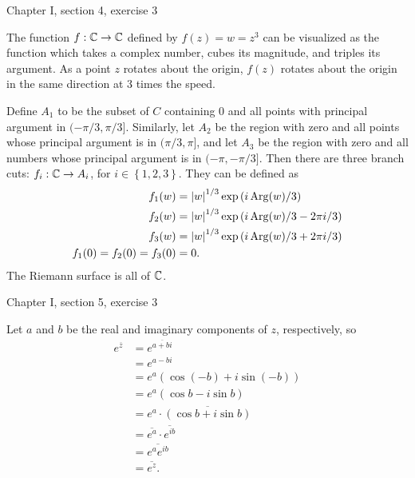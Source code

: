 \documentclass{article}
\begin{document}
\bigskip
\par
\begin{prob}
    Chapter I, section 4, exercise 3
\end{prob}
The function $f: \mathbb{C} \rightarrow \mathbb{C}$ defined by $f(z)=w=z^3$ can be visualized as the function which takes a complex number, cubes its magnitude, and triples its argument. As a point $z$ rotates about the origin, $f(z)$ rotates about the origin in the same direction at 3 times the speed.
\par
Define $A_1$ to be the subset of $C$ containing 0 and all points with principal argument in $(-\pi/3, \pi/3]$. Similarly, let $A_2$ be the region with zero and all points whose principal argument is in $(\pi/3,\pi]$, and let $A_3$ be the region with zero and all numbers whose principal argument is in $(-\pi,-\pi/3]$. Then there are three branch cuts: $f_i: \mathbb{C} \rightarrow A_i$, for $i \in \left\{ 1, 2, 3 \right\}$. They can be defined as
\begin{align*}
    f_1(w) &= \left\lvert w \right\rvert^{1/3} \exp \left( i \operatorname{\mathrm{Arg}}(w)/3 \right) \\
    f_2(w) &= \left\lvert w \right\rvert^{1/3} \exp \left( i \operatorname{\mathrm{Arg}}(w)/3 - 2\pi i/3 \right) \\
    f_3(w) &= \left\lvert w \right\rvert^{1/3} \exp \left( i \operatorname{\mathrm{Arg}}(w)/3 + 2\pi i/3 \right) \\
    f_1(0)=f_2(0)=f_3(0)&=0.
\end{align*}
The Riemann surface is all of $\mathbb{C}$.

\bigskip
\par
\begin{prob}
    Chapter I, section 5, exercise 3
\end{prob}
Let $a$ and $b$ be the real and imaginary components of $z$, respectively, so
\begin{align*}
    e^{\overline{z}} &= e^{\overline{a+bi}} \\
                     &= e^{a-bi} \\
                     &= e^a (\cos (-b) + i \sin(-b)) \\
                     &= e^a (\cos b - i \sin b) \\
                     &= e^a \cdot \overline{(\cos b + i \sin b)} \\
                     &= \overline{e^a} \cdot \overline{e^{ib}} \\
                     &= \overline{e^a e^{ib}} \\
                     &= \overline{e^z}.
\end{align*}
\end{document}
